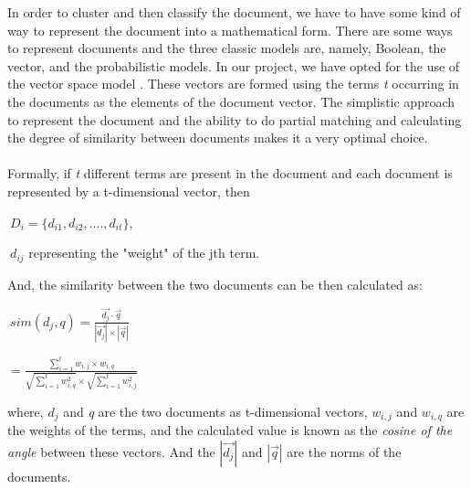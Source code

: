 \documentclass[12pt]{article}
\begin{document}
        In order to cluster and then classify the document, we have to have some kind of way to represent the document into a mathematical form. There are some ways to represent documents and the three classic models are, namely, 
        Boolean, the vector, and the probabilistic models\cite{baeza1999modern}. In our project, we have opted for the use of the vector space model \cite{salton1975vector}. These vectors are formed using the terms \emph{t} occurring in the documents 
        as the elements of the document vector. The simplistic approach to represent the document and the ability to do partial matching and calculating the degree
        of similarity between documents makes it a very optimal choice. 
        \paragraph{}Formally, if \emph{t} different terms are present in the document and each document is represented by a t-dimensional vector, then 
        \begin{center}
           $~{D_i = \{d_{i1}, d_{i2},....,d_{it}\}}$, \\
        \end{center} 
        $~{d_{ij}}$ representing the "weight" of the jth term\cite{salton1975vector}.

        And, the similarity between the two documents can be then calculated as:
            \begin{center}
                $~{   sim(d_j, q) =  \frac{  \vec{d_j} \cdot \vec{q}  } {|\vec{d_j}|  \times |\vec{q}|  }  }$

               \hspace{4.5cm} ${= \frac{\sum_{i=1}^{t}w_{i,j}\times w_{i,q}} {\sqrt{\sum_{i=1}^{t}w_{i,q}^2} \times \sqrt{\sum_{i=1}^{t}w_{i,j}^2}}}$
            \end{center}
            where, \textit{${d_j}$} and \emph{q} are the two documents as t-dimensional vectors, ${w_{i,j}}$ and ${w_{i,q}}$ are the weights of the terms, and the calculated value is known 
            as the \emph{cosine of the angle} between these vectors\cite{baeza1999modern}. And the ${|\vec{d_j}|}$ and ${|\vec{q}|}$ are the norms of the documents.
        
\end{document}
